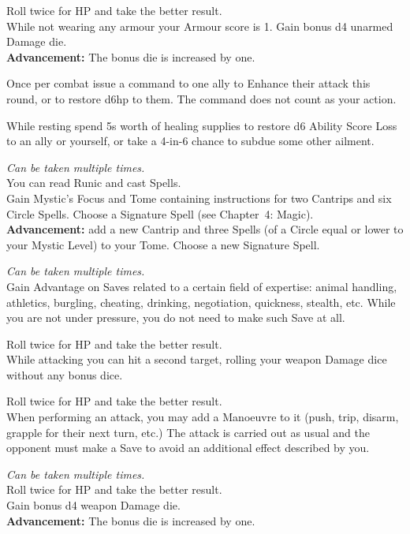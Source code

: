 \documentclass[itdr]{subfiles}
\begin{document}
 Roll twice for HP and take the better result.\\
While not wearing any armour your Armour score is 1. Gain bonus d4 unarmed Damage die.\\
\textbf{Advancement:} The bonus die is increased by one.

Once per combat issue a command to one ally to Enhance their attack this round, or to restore d6hp to them. The command does not count as your action.

While resting spend 5s worth of healing supplies to restore d6 Ability Score Loss to an ally or yourself, or take a 4-in-6 chance to subdue some other ailment.

 {\slshape Can be taken multiple times.}\\
You can read Runic and cast Spells.\\
Gain Mystic's Focus and Tome containing instructions for two Cantrips and six  Circle Spells. Choose a Signature Spell (see Chapter~4: Magic).\\
\textbf{Advancement:} add a new Cantrip and three Spells (of a Circle equal or lower to your Mystic Level) to your Tome. Choose a new Signature Spell.

 {\slshape Can be taken multiple times.}\\
Gain Advantage on Saves related to a certain field of expertise: animal handling, athletics, burgling, cheating, drinking, negotiation, quickness, stealth, etc. While you are not under pressure, you do not need to make such Save at all.

 Roll twice for HP and take the better result.\\
While attacking you can hit a second target, rolling your weapon Damage dice without any bonus dice.

 Roll twice for HP and take the better result.\\
When performing an attack, you may add a Manoeuvre to it (push, trip, disarm, grapple for their next turn, etc.) The attack is carried out as usual and the opponent must make a Save to avoid an additional effect described by you.

 {\slshape Can be taken multiple times.}\\
Roll twice for HP and take the better result.\\
Gain bonus d4 weapon Damage die.\\
\textbf{Advancement:} The bonus die is increased by one.
\end{document}
